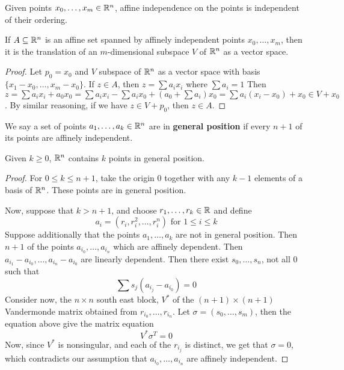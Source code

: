 \begin{corollary}
    Given points $x_0, \dots, x_m \in \mathbb{R}^n$, affine independence on the points
    is independent of their ordering.
\end{corollary}
\begin{corollary}
    If $A \subseteq \mathbb{R}^n$ is an affine set spanned by affinely independent
    points  $x_0, \dots, x_m$, then it is the translation of an $m$-dimensional
    subspace  $V$ of  $\mathbb{R}^n$ as a vector space.
\end{corollary}
\begin{proof}
    Let $p_0=x_0$ and $V$ subspace of  $\mathbb{R}^n$ as a vector space with basis
    $\{x_1-x_0, \dots, x_m-x_0\}$. If $z \in A$, then  $z=\sum{a_ix_i}$ where
    $\sum{a_i}=1$ Then
    $z=\sum{a_ix_i}+a_0x_0=\sum{a_ix_i}-\sum{a_ix_0}+(a_0+\sum{a_i})x_0=
    \sum{a_i(x_i-x_0)}+x_0 \in V+x_0$. By similar reasoning, if we have $z \in
    V+p_0$, then $z \in A$.
\end{proof}

\begin{definition}
    We say a set of points $a_1, \dots, a_k \in \mathbb{R}^n$ are in \textbf{general
    position} if every $n+1$ of its points are affinely independent.
\end{definition}

\begin{theorem}\label{3.1.5}
    Given $k \geq 0$,  $\mathbb{R}^n$ contains  $k$ points in general position.
\end{theorem}
\begin{proof}
    For $0 \leq k \leq n+1$, take the origin $0$ together with any $k-1$
    elements of a basis of $\mathbb{R}^n$. These points are in general position.

    Now, suppose that $k>n+1$, and choose  $r_1, \dots, r_k \in \mathbb{R}$ and define
    \begin{equation*}
        a_i=(r_i,r_i^2, \dots, r_i^n) \text{ for } 1 \leq i \leq k
    \end{equation*}
    Suppose additionally that the points $a_1, \dots, a_k$ are not in general
    position. Then $n+1$ of the points $a_{i_0}, \dots, a_{i_n}$ which are
    affinely dependent. Then $a_{i_1}-a_{i_0}, \dots, a_{i_n}-a_{i_0}$ are
    linearly dependent. Then there exist $s_0, \dots, s_n$, not all $0$ such
    that
    \begin{equation*}
        \sum{s_j(a_{i_j}-a_{i_0})}=0
    \end{equation*}
    Consider now, the $n \times n$ south east block,  $V^*$ of the  $(n+1)
    \times (n+1)$ Vandermonde matrix obtained from $r_{i_0}, \dots, r_{i_n}$.
    Let $\sigma=(s_0, \dots, s_m)$, then the equation above give the matrix
    equation
    \begin{equation}
        V^*\sigma^T=0
    \end{equation}
    Now, since $V^*$ is nonsingular, and each of the  $r_{i_j}$ is distinct, we
    get that $\sigma=0$, which contradicts our assumption that  $a_{i_0}, \dots,
    a_{i_n}$ are affinely independent.
\end{proof}

